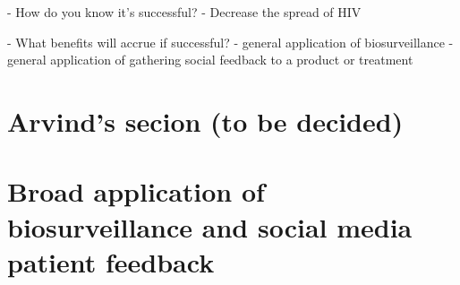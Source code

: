 - How do you know it's successful?
  - Decrease the spread of HIV

- What benefits will accrue if successful?
  - general application of biosurveillance
  - general application of gathering social feedback to a product or treatment




\section{Arvind's secion (to be decided)}


\section{Broad application of biosurveillance and social media patient feedback}

